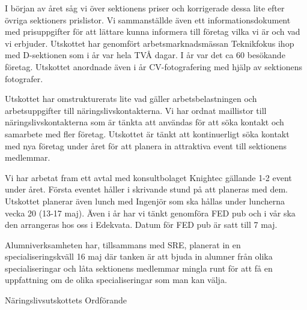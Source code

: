 \documentclass[../_main/handlingar.tex]{subfiles}
\begin{document}

I början av året såg vi över sektionens priser och korrigerade dessa lite efter övriga sektioners prislistor. Vi sammanställde även ett informationsdokument med prisuppgifter för att lättare kunna informera till företag vilka vi är och vad vi erbjuder. Utskottet har genomfört arbetsmarknadsmässan Teknikfokus ihop med D-sektionen som i år var hela TVÅ dagar. I år var det ca 60 besökande företag. Utskottet anordnade även i år CV-fotografering med hjälp av sektionens fotografer.

Utskottet har omstrukturerats lite vad gäller arbetsbelastningen och arbetsuppgifter till näringslivskontakterna. Vi har ordnat maillistor till näringslivskontakterna som är tänkta att användas för att söka kontakt och samarbete med fler företag. Utskottet är tänkt att kontinuerligt söka kontakt med nya företag under året för att planera in attraktiva event till sektionens medlemmar.

Vi har arbetat fram ett avtal med konsultbolaget Knightec gällande 1-2 event under året. Första eventet håller i skrivande stund på att planeras med dem. Utskottet planerar även lunch med Ingenjör som ska hållas under luncherna vecka 20 (13-17 maj). Även i år har vi tänkt genomföra FED pub och i vår ska den arrangeras hos oss i Edekvata. Datum för FED pub är satt till 7 maj.

Alumniverksamheten har, tillsammans med SRE, planerat in en specialiseringskväll 16 maj där tanken är att bjuda in alumner från olika specialiseringar och låta sektionens medlemmar mingla runt för att få en uppfattning om de olika specialiseringar som man kan välja.

\begin{signatures}{1}
    \mvh
    \signature{\enuordf}{Näringslivsutskottets Ordförande}
\end{signatures}
\end{document}
